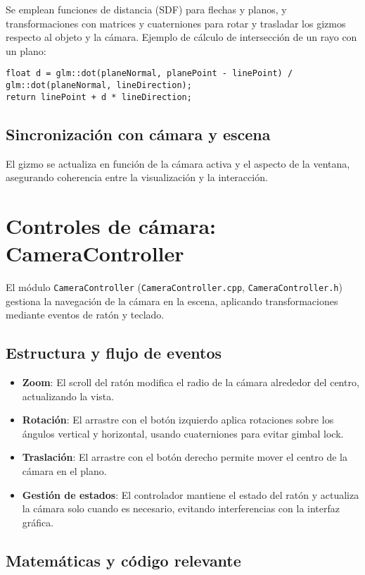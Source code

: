 Se emplean funciones de distancia (SDF) para flechas y planos, y
transformaciones con matrices y cuaterniones para rotar y trasladar los gizmos
respecto al objeto y la cámara. Ejemplo de cálculo de intersección de un rayo
con un plano:
\begin{verbatim}
float d = glm::dot(planeNormal, planePoint - linePoint) / glm::dot(planeNormal, lineDirection);
return linePoint + d * lineDirection;
\end{verbatim}

\subsection{Sincronización con cámara y escena}

El gizmo se actualiza en función de la cámara activa y el aspecto de la
ventana, asegurando coherencia entre la visualización y la interacción.

\section{Controles de cámara: CameraController}

El módulo \texttt{CameraController} (\texttt{CameraController.cpp},
\texttt{CameraController.h}) gestiona la navegación de la cámara en la escena,
aplicando transformaciones mediante eventos de ratón y teclado.

\subsection{Estructura y flujo de eventos}

\begin{itemize}
    \item \textbf{Zoom}: El scroll del ratón modifica el radio de la cámara alrededor del centro, actualizando la vista.
    \item \textbf{Rotación}: El arrastre con el botón izquierdo aplica rotaciones sobre los ángulos vertical y horizontal, usando cuaterniones para evitar gimbal lock.
    \item \textbf{Traslación}: El arrastre con el botón derecho permite mover el centro de la cámara en el plano.
    \item \textbf{Gestión de estados}: El controlador mantiene el estado del ratón y actualiza la cámara solo cuando es necesario, evitando interferencias con la interfaz gráfica.
\end{itemize}

\subsection{Matemáticas y código relevante}

